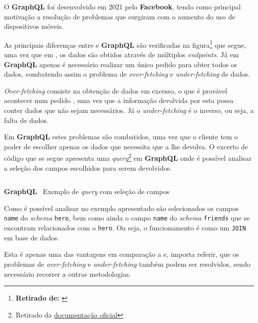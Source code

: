 
O \textbf{GraphQL} foi desenvolvido em 2021 pelo \textbf{Facebook}, tendo como principal motivação a resolução de problemas que surgiram com o aumento do uso de dispositivos móveis.

As principais diferenças entre \textbf{} e \textbf{GraphQL} são verificadas na figura\footnote{\textbf{Retirado de:} \cite{restfulVsGraphql}} que segue, uma vez que em \textbf{}, os dados são obtidos através de múltiplos \textit{endpoints}. Já em \textbf{GraphQL} apenas é necessário realizar um único pedido para obter todos os dados, combatendo assim o problema de \textit{over-fetching} e \textit{under-fetching} de dados.


\textit{Over-fetching} consiste na obtenção de dados em excesso, o que é provável acontecer num pedido \textbf{}, uma vez que a informação devolvida por esta possa conter dados que não sejam necessários. Já o \textit{under-fetching} é o inverso, ou seja, a falta de dados.

Em \textbf{GraphQL} estes problemas são combatidos, uma vez que o cliente tem o poder de escolher apenas os dados que necessita que a \textbf{} lhe devolva. O excerto de código que se segue apresenta uma \textit{query}\footnote{Retirado da \href{https://graphql.org/learn/queries/}{documentação oficial}} em \textbf{GraphQL} onde é possível analisar a seleção dos campos escolhidos para serem devolvidos.

\begin{longlisting}
	\inputminted{text}{code/graphql/example-query.graphql}
	\caption{\textbf{GraphQL} \textemdash~Exemplo de \textit{query} com seleção de campos}
\end{longlisting}

Como é possível analisar no exemplo apresentado são selecionados os campos \texttt{name} do \textit{schema} \texttt{hero}, bem como ainda o campo \texttt{name} do \textit{schema} \texttt{friends} que se encontram relacionados com o \texttt{hero}. Ou seja, o funcionamento é como um \texttt{JOIN} em base de dados.

Esta é apenas uma das vantagens em comparação a \textbf{} e, importa referir, que os problemas de \textit{over-fetching} e \textit{under-fetching} também podem ser resolvidos, sendo necessário recorrer a outras metodologias.

